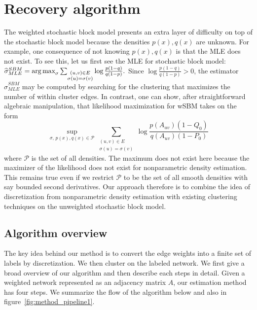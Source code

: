 
\section{Recovery algorithm}
\label{sec:method}

The weighted stochastic block model presents an extra layer of difficulty on top of the stochastic block model because the densities $p(x), q(x)$ are unknown. For example, one consequence of not knowing $p(x), q(x)$ is that the MLE does not exist. To see this, let us first see the MLE for stochastic block model:
$
\widehat{\sigma}^{SBM}_{MLE} = \mathop{\text{\rm arg\,max}}_{\sigma}  \sum_{\substack{ (u,v) \in E \\ \sigma(u) = \sigma(v)}} \log \frac{p(1-q)}{q(1-p)}.
$
Since $\log \frac{p (1-q)}{q (1-p)} > 0$, the estimator $\hat{\sigma}^{SBM}_{MLE}$ may be computed by searching for the clustering that maximizes the number of within cluster edges. In contrast, one can show, after straightforward algebraic manipulation, that likelihood maximization for wSBM takes on the form
\[
\sup_{\sigma,\, p(x), q(x) \in \mathcal{P} } \sum_{\substack{ (u,v) \in E \\ \sigma(u) = \sigma(v)}} \log \frac{p(A_{uv}) (1-Q_0)}{q(A_{uv}) (1-P_0)}
\]
where $\mathcal{P}$ is the set of all densities. The maximum does not exist here because the maximizer of the likelihood does not exist for nonparametric density estimation. This remains true even if we restrict $\mathcal{P}$ to be the set of all smooth densities with say bounded second derivatives. Our approach therefore is to combine the idea of discretization from nonparametric density estimation with existing clustering techniques on the unweighted stochastic block model. 

\subsection{Algorithm overview}

The key idea behind our method is to convert the edge weights into a finite set of labels by discretization. We then cluster on the labeled network. We first give a broad overview of our algorithm and then describe each steps in detail. Given a weighted network represented as an adjacency matrix $A$, our estimation method has four steps. We summarize the flow of the algorithm below and also in figure~\ref{fig:method_pipeline1}.



